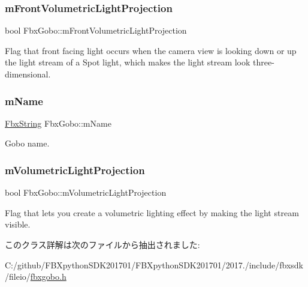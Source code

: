 \mbox{\label{class_fbx_gobo_a7d0ff5a850609339492d0cd218df352b}} 
\subsubsection{\texorpdfstring{m\+Front\+Volumetric\+Light\+Projection}{mFrontVolumetricLightProjection}}
{\footnotesize\ttfamily bool Fbx\+Gobo\+::m\+Front\+Volumetric\+Light\+Projection}



Flag that front facing light occurs when the camera view is looking down or up the light stream of a Spot light, which makes the light stream look three-\/dimensional. 

\mbox{\label{class_fbx_gobo_a4c72db9f7ab3356ed6efe27f271f20b1}} 
\subsubsection{\texorpdfstring{m\+Name}{mName}}
{\footnotesize\ttfamily \hyperlink{class_fbx_string}{Fbx\+String} Fbx\+Gobo\+::m\+Name}



Gobo name. 

\mbox{\label{class_fbx_gobo_a2dfb9b008dfb672a5de78e6dfffe0d89}} 
\subsubsection{\texorpdfstring{m\+Volumetric\+Light\+Projection}{mVolumetricLightProjection}}
{\footnotesize\ttfamily bool Fbx\+Gobo\+::m\+Volumetric\+Light\+Projection}



Flag that lets you create a volumetric lighting effect by making the light stream visible. 



このクラス詳解は次のファイルから抽出されました\+:\begin{DoxyCompactItemize}
\item 
C\+:/github/\+F\+B\+Xpython\+S\+D\+K201701/\+F\+B\+Xpython\+S\+D\+K201701/2017./include/fbxsdk/fileio/\hyperlink{fbxgobo_8h}{fbxgobo.\+h}\end{DoxyCompactItemize}
